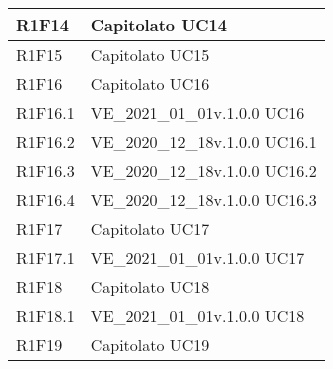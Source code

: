 \begin{center}
\begin{longtable}{|p{22mm}|p{44mm}|}
R1F14 &
Capitolato \newline
UC14 \newline
\\
\hline

R1F15 &
Capitolato \newline
UC15 \newline
\\
\hline

R1F16 &
Capitolato \newline
UC16 \newline
\\
\hline

R1F16.1 &
VE\_2021\_01\_01v.1.0.0 \newline
UC16 \newline
\\
\hline

R1F16.2 &
VE\_2020\_12\_18v.1.0.0 \newline
UC16.1 \newline
\\
\hline

R1F16.3 &
VE\_2020\_12\_18v.1.0.0 \newline
UC16.2 \newline
\\
\hline

R1F16.4 &
VE\_2020\_12\_18v.1.0.0 \newline
UC16.3 \newline
\\
\hline

R1F17 &
Capitolato \newline
UC17 \newline
\\
\hline

R1F17.1 &
VE\_2021\_01\_01v.1.0.0 \newline
UC17 \newline
\\
\hline

R1F18 &
Capitolato \newline
UC18 \newline
\\
\hline

R1F18.1 &
VE\_2021\_01\_01v.1.0.0 \newline
UC18 \newline
\\
\hline

R1F19 &
Capitolato \newline
UC19 \newline
\\
\hline


\end{longtable}
\end{center}

